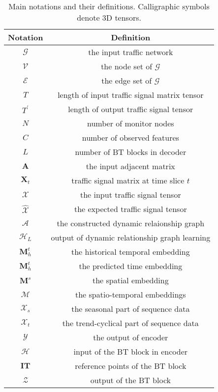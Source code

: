 
\begin{table}[http]
    \vspace{-2mm}
    \begin{center}
    \setlength{\tabcolsep}{1mm}{}	
    \begin{tabular}{c|c}
        \toprule
        Notation  & Definition \\
        \hline
        $\mathcal{G}$ & the input traffic network\\
        $\mathcal{V}$ & the node set of $\mathcal{G}$ \\
        $\mathcal{E}$ & the edge set of $\mathcal{G}$ \\
        $T$ & length of input traffic signal matrix tensor\\
        $T^\prime$ & length of output traffic signal tensor\\
        $N$ & number of monitor nodes \\
        $C$ & number of observed features \\
        $L$ & number of BT blocks in decoder \\
        \hline
        $\mathbf{A}$ & the input adjacent matrix \\
        $\mathbf{X}_{t}$ & traffic signal matrix at time slice $t$ \\
        $\bm{\mathcal{X}}$ & the input traffic signal tensor \\
        $\bm{\mathcal{\hat{X}}}$ & the expected traffic signal tensor \\
        \hline
        $\bm{\mathcal{A}}$ & the constructed dynamic relaionship graph \\
        $\bm{\mathcal{H}}_L$ & output of dynamic relationship graph learning \\
        $\mathbf{M}^{t}_{h}$ & the historical temporal embedding \\
        $\mathbf{M}^{t}_{h}$ & the predicted time embedding \\
        $\mathbf{M}^{s}$ & the spatial embedding \\ 
        $\bm{\mathcal{M}}$ & the spatio-temporal embeddings \\
        $\bm{\mathcal{X}}_{s}$ & the seasonal part of sequence data \\
        $\bm{\mathcal{X}}_{t}$ & the trend-cyclical part of sequence data \\
        \hline
        $\bm{\mathcal{Y}}$ & the output of encoder \\
        $\bm{\mathcal{H}}$ & input of the BT block in encoder \\ 
        $\mathbf{IT}$ & reference points of the BT block \\
        $\bm{\mathcal{Z}}$ & output of the BT block \\
        \bottomrule
    \end{tabular}
    \vspace{-2mm}
    \caption{Main notations and their definitions. Calligraphic symbols denote 3D tensors.}
    \vspace{-6mm}
    \label{tab.notations}
    \end{center}
\end{table}

